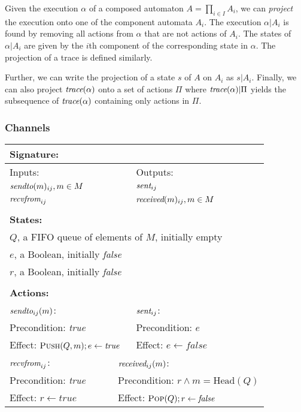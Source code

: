 Given the execution $\alpha$ of a composed automaton $A = \prod_{i \in I} A_i$,
we can \textit{project} the execution onto one of the component automata $A_i$.
The execution $\alpha|A_i$ is found by removing all actions from
$\alpha$ that are not actions of $A_i$. The states of $\alpha|A_i$ are
given by the $i$th component of the corresponding state in $\alpha$. The
projection of a trace is defined similarly.

Further, we can write the projection of a state $s$ of $A$ on $A_i$ as $s|A_i$.  Finally, we can also project $\operatorname*{\textit{trace}}(\alpha)$ onto a set of actions $\Pi$ where $\operatorname*{\textit{trace}}(\alpha)|\Pi$ yields the subsequence of $\operatorname*{\textit{trace}}(\alpha)$ containing only actions in $\Pi$.

\subsubsection{Channels}
\label{sec:equivalence:preliminaries:channels}

\begin{table}[!t]
  \centering
  \begin{tabular}{l l l}
    \multicolumn{3}{l}{\textbf{Signature:}} \\ \hline
    Inputs: & & Outputs: \\
    $\operatorname*{\operatorname*{\textit{sendto}}}(m)_{ij}, m \in M$ & & $\operatorname*{\textit{sent}}_{ij}$ \\
    $\operatorname*{\operatorname*{\textit{recvfrom}}}_{ij}$ & & $\operatorname*{\textit{received}}(m)_{ij}, m \in M$ \\ \hline
    \\
    \multicolumn{3}{l}{\textbf{States:}} \\ \hline
    \multicolumn{3}{l}{$Q$, a FIFO queue of elements of $M$, initially empty} \\
    \multicolumn{3}{l}{$e$, a Boolean, initially \textit{false}} \\
    \multicolumn{3}{l}{$r$, a Boolean, initially \textit{false}} \\ \hline
    \\
    \multicolumn{3}{l}{\textbf{Actions:}} \\ \hline
    \multicolumn{2}{l|}{$\operatorname*{\operatorname*{\textit{sendto}}}_{ij}(m)$:} & $\operatorname*{\textit{sent}}_{ij}$: \\
    \multicolumn{2}{l|}{Precondition: \textit{true}} & Precondition: $e$ \\
    \multicolumn{2}{l|}{Effect: $\textsc{Push}(Q,m); e \gets \textit{true}$} & Effect: $e \gets \textit{false}$ \\
    \hline \hline
    $\operatorname*{\operatorname*{\textit{recvfrom}}}_{ij}$: & \multicolumn{2}{|l}{$\operatorname*{\textit{received}}_{ij}(m)$:} \\
    Precondition: \textit{true} & \multicolumn{2}{|l}{Precondition: $r \land m = \text{Head}(Q)$} \\
    Effect: $r \gets \textit{true}$ & \multicolumn{2}{|l}{Effect: $\textsc{Pop}(Q); r \gets \textit{false}$} \\ \hline
  \end{tabular}
  \label{fig:buffered-channel-ioa}
\end{table}

